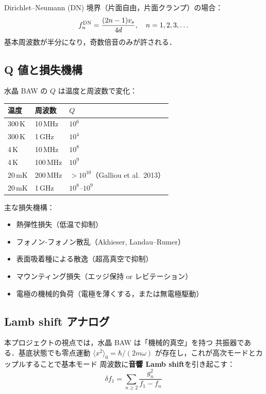 \documentclass[11pt,a4paper]{article}
\begin{document}
Dirichlet--Neumann (DN) 境界（片面自由，片面クランプ）の場合：
\begin{equation}
  f_n^{\rm DN} = \frac{(2n-1) v_s}{4d},\quad n=1,2,3,\ldots
\end{equation}
基本周波数が半分になり，奇数倍音のみが許される．

\subsection{Q 値と損失機構}

水晶 BAW の $Q$ は温度と周波数で変化：

\begin{center}
\begin{tabular}{lll}
\toprule
温度 & 周波数 & $Q$ \\
\midrule
300\,K & 10\,MHz & $10^6$ \\
300\,K & 1\,GHz & $10^4$ \\
4\,K & 10\,MHz & $10^8$ \\
4\,K & 100\,MHz & $10^9$ \\
20\,mK & 200\,MHz & $>10^{10}$（Galliou et al.\ 2013）\\
20\,mK & 1\,GHz & $10^8$--$10^9$ \\
\bottomrule
\end{tabular}
\end{center}

主な損失機構：
\begin{itemize}
\item 熱弾性損失（低温で抑制）
\item フォノン-フォノン散乱（Akhieser, Landau--Rumer）
\item 表面吸着種による散逸（超高真空で抑制）
\item マウンティング損失（エッジ保持 or レビテーション）
\item 電極の機械的負荷（電極を薄くする，または無電極駆動）
\end{itemize}

\subsection{Lamb shift アナログ}

本プロジェクトの視点では，水晶 BAW は「機械的真空」を持つ
共振器である．基底状態でも零点運動 $\langle x^2\rangle_0 = \hbar/(2m\omega)$
が存在し，これが高次モードとカップルすることで基本モード
周波数に\textbf{音響 Lamb shift}を引き起こす：
\begin{equation}
  \delta f_1 = \sum_{n\geq 2} \frac{g_n^2}{f_1 - f_n}
\end{equation}
\end{document}
